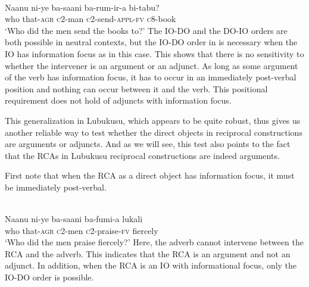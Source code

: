\documentclass[output=paper]{langsci/langscibook}
\begin{document}
\ea\label{ex:safir:17} 
\settowidth{}
\\
\gll   Naanu    ni-ye    ba-saani   ba-rum-ir-a     bi-tabu?\\
     who     that-\textsc{agr}   \textsc{c}2-man   \textsc{c}2-send-\textsc{appl-fv}   \textsc{c}8-book\\
\glt ‘Who did the men send the books to?’
\z
\z
{}
The IO-DO and the DO-IO orders are both possible in neutral contexts, but the IO-DO order in  is necessary when the IO has information focus as in this case. This shows that there is no sensitivity to whether the intervener is an argument or an adjunct. As long as some argument of the verb has information focus, it has to occur in an immediately post-verbal position and nothing can occur between it and the verb. This positional requirement does not hold of adjuncts with information focus.

This generalization in Lubukusu, which appears to be quite robust, thus gives us another reliable way to test whether the direct objects in reciprocal constructions are arguments or adjuncts. And as we will see, this test also points to the fact that the RCAs in Lubukusu reciprocal constructions are indeed  arguments.

First note that when the RCA as a direct object has information focus, it must be immediately post-verbal. 


\ea\label{ex:safir:18}
\settowidth{}
\\
\gll Naanu  ni-ye     ba-saani   ba-fumi-a   lukali\\
who   that-\textsc{agr}  \textsc{c}2-men   \textsc{c}2-praise-\textsc{fv}   fiercely\\
\glt ‘Who did the men praise fiercely?’
\z
\z
{}
Here, the adverb cannot intervene between the RCA and the adverb. This indicates that the RCA is an argument and not an adjunct. In addition, when the RCA is an IO with informational focus, only the IO-DO order is possible.
\end{document}
